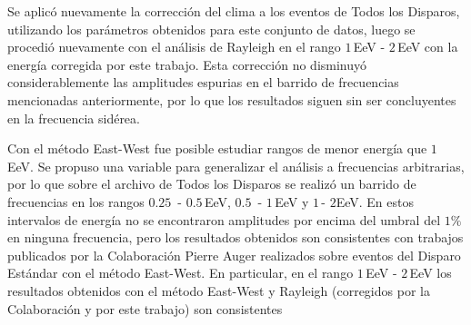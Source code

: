 Se aplicó nuevamente la corrección del clima a los eventos de Todos los Disparos, utilizando los parámetros obtenidos para este conjunto de datos,  luego se procedió nuevamente con el análisis de Rayleigh en el rango $1\,$EeV - $2\,$EeV con la energía corregida por este trabajo. Esta corrección no disminuyó considerablemente las amplitudes espurias en el barrido de frecuencias mencionadas anteriormente, por lo que los resultados siguen sin ser concluyentes en la frecuencia sidérea.

Con el método East-West fue posible estudiar rangos de menor energía que $1\,$EeV. Se propuso una variable para generalizar el análisis a frecuencias arbitrarias, por lo que sobre el archivo de Todos los Disparos se realizó un barrido de frecuencias en  los rangos $0.25\,$ - $0.5\,$EeV, $0.5\,$ - $1\,$EeV y $1\,$- $2$EeV. En estos intervalos de energía no se encontraron amplitudes por encima del umbral del $1\%$ en ninguna frecuencia, pero los  resultados obtenidos son consistentes con trabajos publicados por la Colaboración Pierre Auger realizados sobre eventos del Disparo Estándar con el método East-West. En particular, en el rango $1\,$EeV - $2\,$EeV los resultados obtenidos con el método East-West y Rayleigh (corregidos por la Colaboración y por este trabajo) son consistentes


